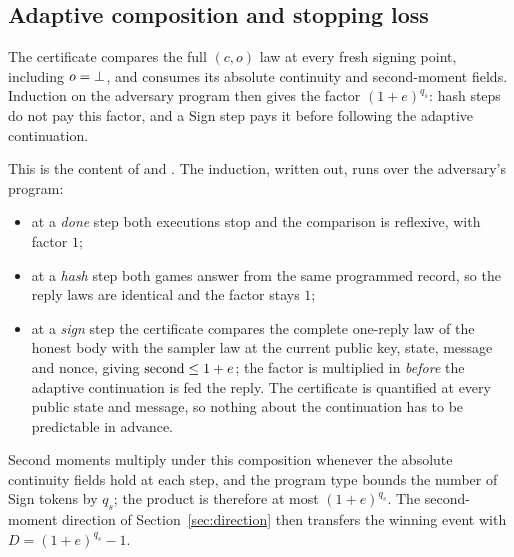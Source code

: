 \subsection{Adaptive composition and stopping loss}
\begin{lemma}\label{lem:composition}
The certificate compares the full $(c,o)$ law at every fresh signing
point, including $o=\bot$, and consumes its absolute continuity and
second-moment fields. Induction on the adversary program then gives the
factor $(1+e)^{q_s}$: hash steps do not pay this factor, and a Sign step
pays it before following the adaptive continuation.
\end{lemma}
This is the content of  and
. The induction, written out, runs over the
adversary's program:
\begin{itemize}
\item at a \emph{done} step both executions stop and the comparison is
 reflexive, with factor $1$;
\item at a \emph{hash} step both games answer from the same programmed
 record, so the reply laws are identical and the factor stays $1$;
\item at a \emph{sign} step the certificate compares the complete
 one-reply law of the honest body with the sampler law at the current
 public key, state, message and nonce, giving $\operatorname{second}\leq 1+e$; the
 factor is multiplied in \emph{before} the adaptive continuation is
 fed the reply. The certificate is quantified at every public state and
 message, so nothing about the continuation has to be predictable in
 advance.
\end{itemize}
Second moments multiply under this composition whenever the absolute
continuity fields hold at each step, and the program type bounds the
number of Sign tokens by $q_s$; the product is therefore at most
$(1+e)^{q_s}$. The second-moment direction of
Section~\ref{sec:direction} then transfers the winning event with
$D=(1+e)^{q_s}-1$.


